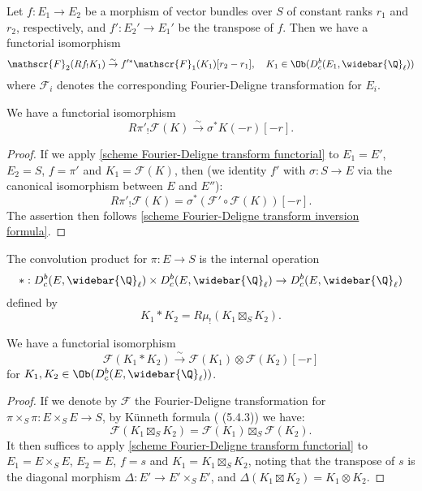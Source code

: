 \begin{theorem}\label{scheme Fourier-Deligne transform functorial}
Let $f:E_1\to E_2$ be a morphism of vector bundles over $S$ of constant ranks $r_1$ and $r_2$, respectively, and $f':E_2'\to E_1'$ be the transpose of $f$. Then we have a functorial isomorphism
\[\mathscr{F}_2(Rf_!K_1)\stackrel{\sim}{\to}f'^*\mathscr{F}_1(K_1)[r_2-r_1],\quad K_1\in\Ob(D^b_c(E_1,\widebar{\Q}_\ell))\]
where $\mathscr{F}_i$ denotes the corresponding Fourier-Deligne transformation for $E_i$.
\end{theorem}

\begin{corollary}\label{scheme Fourier-Deligne transform direct image char}
We have a functorial isomorphism
\[R\pi'_!\mathscr{F}(K)\stackrel{\sim}{\to}\sigma^*K(-r)[-r].\]
\end{corollary}
\begin{proof}
If we apply \cref{scheme Fourier-Deligne transform functorial} to $E_1=E'$, $E_2=S$, $f=\pi'$ and $K_1=\mathscr{F}(K)$, then (we identity $f'$ with $\sigma:S\to E$ via the canonical isomorphism between $E$ and $E''$):
\[R\pi'_!\mathscr{F}(K)=\sigma^*(\mathscr{F}'\circ\mathscr{F}(K))[-r].\]
The assertion then follows \cref{scheme Fourier-Deligne transform inversion formula}.
\end{proof}

\begin{definition}
The convolution product for $\pi:E\to S$ is the internal operation
\[\ast:D^b_c(E,\widebar{\Q}_\ell)\times D^b_c(E,\widebar{\Q}_\ell)\to D^b_c(E,\widebar{\Q}_\ell)\]
defined by
\[K_1\ast K_2=R\mu_!(K_1\boxtimes_SK_2).\]
\end{definition}

\begin{proposition}\label{scheme Fourier-Deligne transform of convolution}
We have a functorial isomorphism
\[\mathscr{F}(K_1\ast K_2)\stackrel{\sim}{\to}\mathscr{F}(K_1)\otimes\mathscr{F}(K_2)[-r]\]
for $K_1,K_2\in\Ob(D^b_c(E,\widebar{\Q}_\ell))$.
\end{proposition}
\begin{proof}
If we denote by $\mathscr{F}$ the Fourier-Deligne transformation for $\pi\times_S\pi:E\times_SE\to S$, by K\"unneth formula (\cite{SGA4}  (5.4.3)) we have:
\[\mathscr{F}(K_1\boxtimes_SK_2)=\mathscr{F}(K_1)\boxtimes_S\mathscr{F}(K_2).\]
It then suffices to apply \cref{scheme Fourier-Deligne transform functorial} to $E_1=E\times_SE$, $E_2=E$, $f=s$ and $K_1=K_1\boxtimes_SK_2$, noting that the transpose of $s$ is the diagonal morphism $\Delta:E'\to E'\times_SE'$, and $\Delta(K_1\boxtimes K_2)=K_1\otimes K_2$.
\end{proof}


